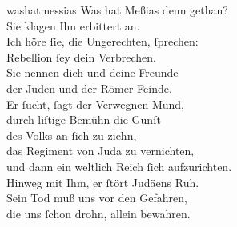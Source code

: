 \documentclass[tocstyle=ref-genre]{ees}
\begin{document}
{  \begin{movement}{washatmessias}
    \voice[Tenore]
    Was hat Meßias denn gethan?\\
    Sie klagen Ihn erbittert an.\\
    Ich höre ſie, die Ungerechten, ſprechen:\\
    Rebellion ſey dein Verbrechen.\\
    Sie nennen dich und deine Freunde\\
    der Juden und der Römer Feinde.\\
    Er ſucht, ſagt der Verwegnen Mund,\\
    durch liſtige Bemühn die Gunſt\\
    des Volks an ſich zu ziehn,\\
    das Regiment von Juda zu vernichten,\\
    und dann ein weltlich Reich ſich aufzurichten.\\
    Hinweg mit Ihm, er ſtört Judäens Ruh.\\
    Sein Tod muß uns vor den Gefahren,\\
    die uns ſchon drohn, allein bewahren.
  \end{movement}

  \begin{movement}{}
    \voice[]
  \end{movement}
}

\eesScore
\end{document}
